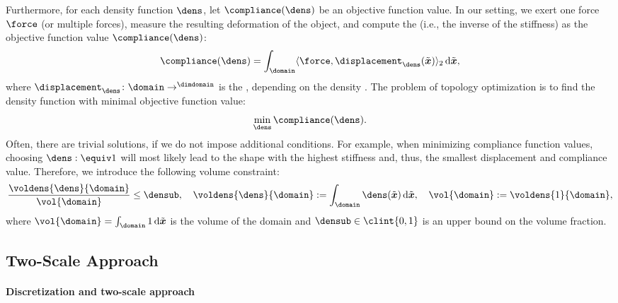 Furthermore, for each density function $\dens$,
let $\compliance(\dens)$ be an objective function value.
In our setting,
we exert one force $\force$ (or multiple forces),
measure the resulting deformation of the object, and
compute the  (i.e., the inverse of the stiffness) as
the objective function value $\compliance(\dens)$:
\begin{equation}
  \compliance(\dens)
  = \int_{\domain} \innerprod[2]{\force}{\displacement_{\dens}(\tilde{\*x})}
  \diff\tilde{\*x},
\end{equation}
where $\displacement_{\dens}\colon \domain \to \real^{\dimdomain}$
is the , depending on the density
\cite{Huebner14Mehrdimensionale}.
The problem of topology optimization is to find the density function
with minimal objective function value:
\begin{equation}
  \label{eq:topoOptProblemContinuous}
  \min_{\dens} \compliance(\dens).
\end{equation}
Often, there are trivial solutions, if we do not impose additional conditions.
For example, when minimizing compliance function values,
choosing $\dens :\equiv 1$ will most likely lead to the shape with the
highest stiffness and, thus, the smallest displacement and compliance value.
Therefore, we introduce the following volume constraint:
\begin{equation}
  \frac{\voldens{\dens}{\domain}}{\vol{\domain}} \le \densub,\quad
  \voldens{\dens}{\domain}
  := \int_{\domain} \dens(\tilde{\*x}) \diff\tilde{\*x},\quad
  \vol{\domain}
  := \voldens{1}{\domain},
\end{equation}
where $\vol{\domain} = \int_{\domain} 1 \diff\tilde{\*x}$
is the volume of the domain and
$\densub \in \clint{0, 1}$ is an upper bound on the volume fraction.

\subsection{Two-Scale Approach}
\label{sec:612twoScale}

\paragraph{Discretization and two-scale approach}

